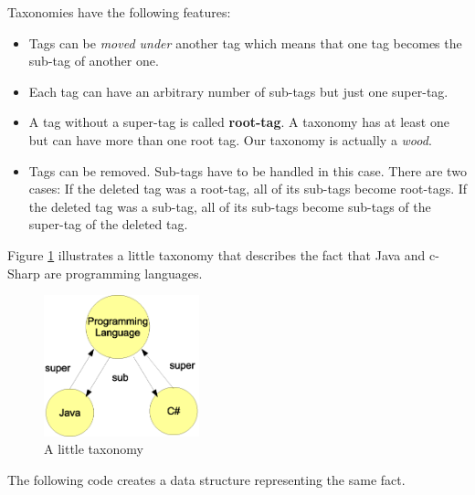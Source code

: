 Taxonomies have the following features:

\begin{itemize}
    \item 
Tags can be {\it moved under} another tag which means that one tag becomes the sub-tag of another one.

    \item 
Each tag can have an arbitrary number of sub-tags but just one super-tag.

    \item 
A tag without a super-tag is called {\bf root-tag}. A taxonomy has at least one but can have more than one root tag. Our taxonomy is actually a {\it wood}.

    \item 
Tags can be removed. Sub-tags have to be handled in this case. There are two cases: If the deleted tag was a root-tag, all of its sub-tags become root-tags. If the deleted tag was a sub-tag, all of its sub-tags become sub-tags of the super-tag of the deleted tag.

\end{itemize}

Figure \ref{fig:taxonomy} illustrates a little taxonomy that describes the fact that Java and c-Sharp are programming languages.

\begin{figure}[t]
\centering
\includegraphics[width=0.40\textwidth]{taxonomy.eps}
\caption{A little taxonomy}
\label{fig:taxonomy}
\end{figure}

The following code creates a data structure representing the same fact.

